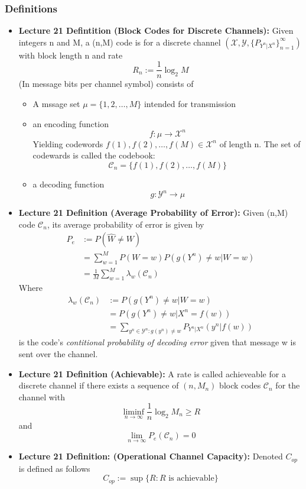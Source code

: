 \documentclass{article}
\begin{document}
\subsubsection{Definitions}
\begin{itemize}
    \item \textbf{Lecture 21 Defintition (Block Codes for Discrete Channels): }
    Given integers n and M, a (n,M) code is for a discrete channel \((\mathcal{X}, \mathcal{Y}, \{P_{Y^n|X^n}\}_{n=1}^\infty)\) with block length n and rate
    \[R_n := \frac{1}{n} \log_2 M\]
    (In message bits per channel symbol) consists of
    \begin{itemize}
        \item A mssage set \(\mu = \{1,2,\ldots, M\}\) intended for transmission
        \item an encoding function
        \[f: \mu \to \mathcal{X}^n\]
        Yielding codewords \(f(1), f(2), \ldots, f(M) \in \mathcal{X}^n\) of length n. The set of codewards is called the codebook:
        \[\mathcal{C}_n = \{f(1), f(2), \ldots, f(M)\}\]
        \item a decoding function
        \[g: \mathcal{Y}^n \to \mu\]
    \end{itemize}
    \item \textbf{Lecture 21 Definition (Average Probability of Error): } Given (n,M) code \(\mathcal{C}_n\), its average probability of error is given by
    \begin{align*}
        P_e & :=P(\hat{W} \neq W) \\
        & = \sum_{w=1}^M P(W=w) P(g(Y^n)\neq w|W=w) \\
        & = \frac{1}{M} \sum_{w=1}^M \lambda_w(\mathcal{C}_n)
    \end{align*}
    Where
    \begin{align*}
        \lambda_w(\mathcal{C}_n)&:= P(g(Y^n) \neq w | W = w) \\
        & = P(g(Y^n)\neq w |X^n = f(w)) \\
        & = \sum_{y^n \in \mathcal{Y}^n: g(y^n) \neq w} P_{Y^n|X^n}(y^n | f(w))
    \end{align*}
    is the code's \textit{contitional probability of decoding error} given that message w is sent over the channel.
    \item \textbf{Lecture 21 Definition (Achievable): } A rate is called achieveable for a discrete channel if there exists a sequence of \((n, M_n)\) block codes \(\mathcal{C}_n\)
    for the channel with
    \[\liminf_{n \to \infty} \frac{1}{n} \log_2 M_n \geq R\]
    and 
    \[\lim_{n \to \infty} P_e(\mathcal{C}_n) = 0\]
    \item \textbf{Lecture 21 Definition: (Operational Channel Capacity): } Denoted \(C_{op}\) is defined as follows
    \[C_{op} := \sup \{R: R \text{ is achievable}\}\]
\end{itemize}
\end{document}
